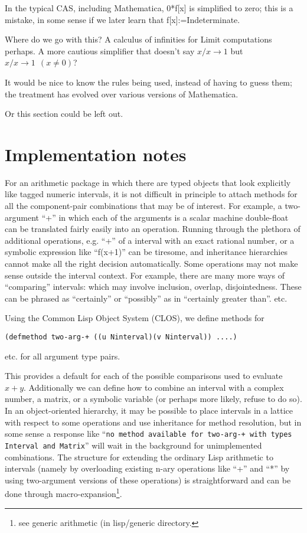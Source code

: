 \documentclass{article}
\begin{document}
In the typical CAS, including
Mathematica, 0*f[x] is simplified to zero; this is
a mistake, in some sense if we later learn that  f[x]:=Indeterminate.

Where do we go with this?  A calculus of infinities for Limit
computations perhaps. A more cautious simplifier that doesn't say $x/x
\rightarrow 1$ but $x/x \rightarrow 1 ~~(x\ne 0)$?

It would be nice to know the rules being used, instead of having to
guess them; the treatment has evolved over various versions of Mathematica.

Or this section could be left out.

{\section{Implementation notes}

For an arithmetic package in which there are typed objects
that look explicitly like tagged numeric intervals, it is
not difficult in principle to attach methods for all the component-pair
combinations that may be of interest. For example, a two-argument ``+'' in
which each of the arguments is a scalar machine double-float can be
translated fairly easily into an operation.  Running through the plethora
of additional operations, e.g. ``+'' of a interval with an exact rational number,
or a symbolic expression like ``f(x+1)'' can be tiresome, and inheritance
hierarchies cannot make all the right decision automatically. Some operations
may not make sense outside the interval context. For example, there are many more ways
of ``comparing'' intervals: which may involve inclusion, overlap, disjointedness. These
can be phrased as ``certainly'' or ``possibly''  as in ``certainly greater than''.
etc.

Using the Common Lisp Object System (CLOS), we define methods for
\begin{verbatim}
(defmethod two-arg-+ ((u Ninterval)(v Ninterval)) ....)
\end{verbatim}
etc. for all argument type pairs.

This provides a default for each of the possible comparisons used to
evaluate $x+y$.  Additionally we can define how to combine an interval
with a complex number, a matrix, or a symbolic variable (or perhaps
more likely, refuse to do so).  In an object-oriented hierarchy, it
may be possible to place intervals in a lattice with respect to some
operations and use inheritance for method resolution, but in some
sense a response like ``{\tt no method available for two-arg-+ with
types Interval and Matrix}'' will wait in the background for
unimplemented combinations.  The structure for extending the ordinary
Lisp arithmetic to intervals (namely by overloading existing n-ary
operations like ``+'' and ``*'' by using two-argument versions of
these operations) is straightforward and can be done through
macro-expansion\footnote {see generic arithmetic (in lisp/generic
directory.}.

}
\end{document}
